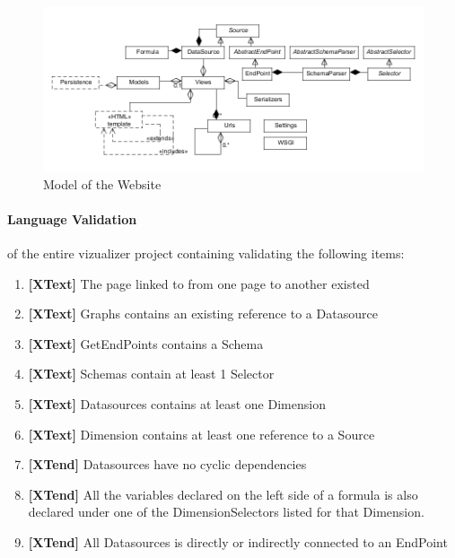 \begin{figure}
\begin{center}
\includegraphics[width=\linewidth]{images/websitemodel}
\end{center}
\caption{Model of the Website}
\label{fig:websitemodel}
\end{figure}

\paragraph{Language Validation}
of the entire vizualizer project containing validating the following items:
\begin{enumerate}
\item \textbf{[XText]} The page linked to from one page to another existed
\item \textbf{[XText]} Graphs contains an existing reference to a Datasource
\item \textbf{[XText]} GetEndPoints contains a Schema
\item \textbf{[XText]} Schemas contain at least 1 Selector
\item \textbf{[XText]} Datasources contains at least one Dimension
\item \textbf{[XText]} Dimension contains at least one reference to a Source
\item \textbf{[XTend]} Datasources have no cyclic dependencies
\item \textbf{[XTend]} All the variables declared on the left side of a formula is also declared under one of the DimensionSelectors listed for that Dimension.
\item \textbf{[XTend]} All Datasources is directly or indirectly connected to an EndPoint
\end{enumerate}

